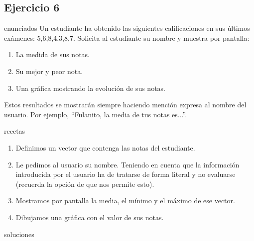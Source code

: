 \subsection{Ejercicio 6}
\def\parte{enunciados}
\ifx\capitulo\parte
Un estudiante ha obtenido las siguientes calificaciones en sus últimos exámenes: 5,6,8,4,3,8,7. Solicita al estudiante su nombre y muestra por pantalla:

\begin{enumerate}
\item La medida de sus notas.
\item Su mejor y peor nota.
\item Una gráfica mostrando la evolución de sus notas.
\end{enumerate}

Estos resultados se mostrarán siempre haciendo mención expresa al nombre del usuario. Por ejemplo, ``Fulanito, la media de tus notas es...''.
\fi

\def\parte{recetas}
\ifx\capitulo\parte
\begin{enumerate}
\item Definimos un vector que contenga las notas del estudiante. 
\item Le pedimos al usuario su nombre. Teniendo en cuenta que la información introducida por el usuario ha de tratarse de forma literal y no evaluarse (recuerda la opción de  que nos permite esto).
\item Mostramos por pantalla la media, el mínimo y el máximo de ese vector.
\item Dibujamos una gráfica con el valor de sus notas.
\end{enumerate}
\fi

\def\parte{soluciones}
\ifx\capitulo\parte

\fi
